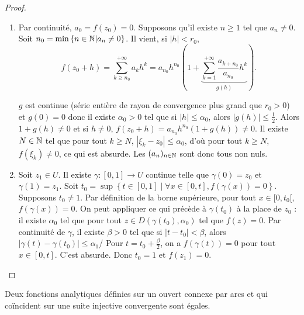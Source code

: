 \documentclass[12pt]{article}
\begin{document}
\begin{proof}
    \phantom{}
    \begin{enumerate}
        \item Par continuité, $a_0=f(z_{0})=0$. Supposons qu'il existe $n\geqslant1$ tel que $a_n\neq0$. Soit $n_{0}=\min\left\lbrace n\in\mathbb{N}\middle| a_n\neq0\right\rbrace$. Il vient, si $\left\lvert h\right\rvert<r_0$, 
        \begin{equation}
            f(z_{0}+h)=\sum_{k\geqslant n_{0}}^{+\infty}a_k h^{k}=a_{n_{0}}h^{n_{0}}\left(1+\underbrace{\sum_{k=1}^{+\infty}\frac{a_{k+n_0}}{a_{n_{0}}}h^{k}}_{g(h)}\right).
        \end{equation}

        $g$ est continue (série entière de rayon de convergence plus grand que $r_0>0$) et $g(0)=0$ donc il existe $\alpha_{0}>0$ tel que si $\left\lvert h\right\rvert\leqslant\alpha_{0}$, alors $\left\lvert g(h)\right\rvert\leqslant\frac{1}{2}$. Alors $1+g(h)\neq0$ et si $h\neq0$, $f(z_{0}+h)=a_{n_{0}}h^{n_{0}}\left(1+g(h)\right)\neq0$. Il existe $N\in\mathbb{N}$ tel que pour tout $k\geqslant N$, $\left\lvert \xi_{k}-z_{0}\right\rvert\leqslant\alpha_{0}$, d'où pour tout $k\geqslant N$, $f(\xi_{k})\neq0$, ce qui est absurde. Les $(a_n)_{n\in\mathbb{N}}$ sont donc tous non nuls.

        \item Soit $z_1\in U$. Il existe $\gamma\colon[0,1]\to U$ continue telle que $\gamma(0)=z_{0}$ et $\gamma(1)=z_{1}$. Soit $t_{0}=\sup\left\lbrace t\in[0,1]\middle|\forall x\in[0,t],f(\gamma(x))=0\right\rbrace$. Supposons $t_{0}\neq1$. Par définition de la borne supérieure, pour tout $x\in[0,t_0[$, $f(\gamma(x))=0$. On peut appliquer ce qui précède à $\gamma(t_0)$ à la place de $z_{0}$ : il existe $\alpha_{0}$ tel que pour tout $z\in D(\gamma(t_{0}),\alpha_{0})$ tel que $f(z)=0$. Par continuité de $\gamma$, il existe $\beta>0$ tel que si $\left\lvert t-t_{0}\right\rvert<\beta$, alors $\left\lvert\gamma(t)-\gamma(t_{0})\right\rvert\leqslant\alpha_{1}$/ Pour $t=t_{0}+\frac{\beta}{2}$, on a $f(\gamma(t))=0$ pour tout $x\in[0,t]$. C'est absurde. Donc $t_{0}=1$ et $f(z_{1})=0$.
    \end{enumerate}
\end{proof}

\begin{remark}
    Deux fonctions analytiques définies sur un ouvert connexe par arcs et qui coïncident sur une suite injective convergente sont égales.
\end{remark}
\end{document}
